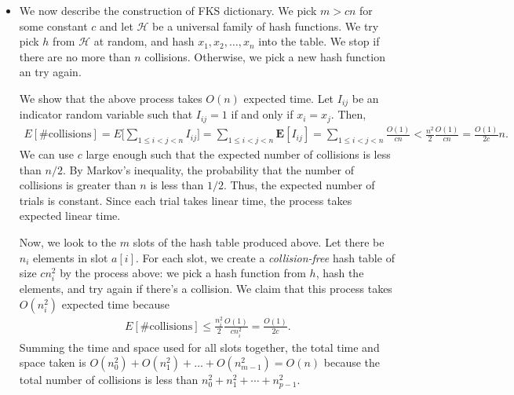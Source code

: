 \documentclass{article}
\newcommand{\E}{\mathbf{E}}
\begin{document}
\begin{itemize}
\item We now describe the construction of FKS dictionary. We pick $m > cn$ for some constant $c$ and let $\mathcal{H}$ be a universal family of hash functions. We try pick $h$ from $\mathcal{H}$ at random, and hash $x_1, x_2, \dotsc, x_n$ into the table. We stop if there are no more than $n$ collisions. Otherwise, we pick a new hash function an try again. 

We show that the above process takes $O(n)$ expected time. Let $I_{ij}$ be an indicator random variable such that $I_{ij} = 1$ if and only if $x_i = x_j$. Then,
\begin{align*}
E[\mathrm{\# collisions}] = E\bigg[ \sum_{1\leq i<j < n} I_{ij} \bigg] = \sum_{1\leq i<j< n} \E[I_{ij}] = \sum_{1\leq i<j< n} \frac{O(1)}{cn} < \frac{n^2}{2}\frac{O(1)}{cn} = \frac{O(1)}{2c}n.
\end{align*}
We can use $c$ large enough such that the expected number of collisions is less than $n/2$. By Markov's inequality, the probability that the number of collisions is greater than $n$ is less than $1/2$. Thus, the expected number of trials is constant. Since each trial takes linear time, the process takes expected linear time.

Now, we look to the $m$ slots of the hash table produced above. Let there be $n_i$ elements in slot $a[i]$. For each slot, we create a \emph{collision-free} hash table of size $cn_i^2$ by the process above: we pick a hash function from $h$, hash the elements, and try again if there's a collision. We claim that this process takes $O(n_i^2)$ expected time because
\begin{align*}
E[\mathrm{\# collisions}] \leq \frac{n_i^2}{2} \frac{O(1)}{cn_i^2} = \frac{O(1)}{2c}.
\end{align*}
Summing the time and space used for all slots together, the total time and space taken is $O(n_0^2) + O(n_1^2) + \dotsc + O(n_{m-1}^2) = O(n)$ because the total number of collisions is less than $n_0^2 + n_1^2 + \dotsb + n_{p-1}^2$.
\end{itemize}
\end{document}

